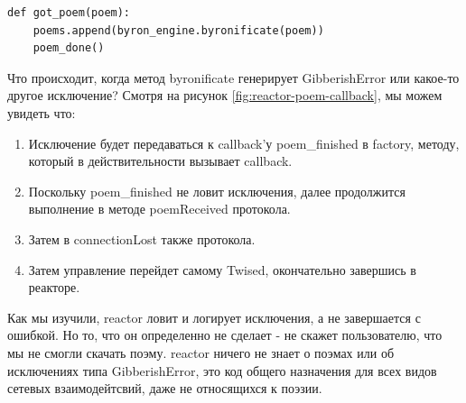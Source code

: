 \begin{scriptsize}\begin{verbatim}
def got_poem(poem):
    poems.append(byron_engine.byronificate(poem))
    poem_done()
\end{verbatim}\end{scriptsize}


Что происходит, когда метод byronificate генерирует GibberishError или 
какое-то другое исключение? Смотря на рисунок \ref{fig:reactor-poem-callback}, 
мы можем увидеть что: 

\begin{enumerate}
   
\item Исключение будет передаваться к callback'у poem\_finished в factory, 
методу, который в действительности вызывает callback. 

\item Поскольку poem\_finished не ловит исключения, далее продолжится 
выполнение в методе poemReceived протокола. 

\item Затем в connectionLost также протокола.

\item Затем управление перейдет самому Twised, окончательно 
завершись в реакторе. 

\end{enumerate}

Как мы изучили, reactor ловит и логирует 
исключения, а не завершается с ошибкой. Но то, что он 
определенно не сделает - не скажет пользователю, что 
мы не смогли скачать поэму. reactor ничего не знает о поэмах 
или об исключениях типа GibberishError, это код общего 
назначения для всех видов сетевых взаимодейтсвий, даже 
не относящихся к поэзии.


